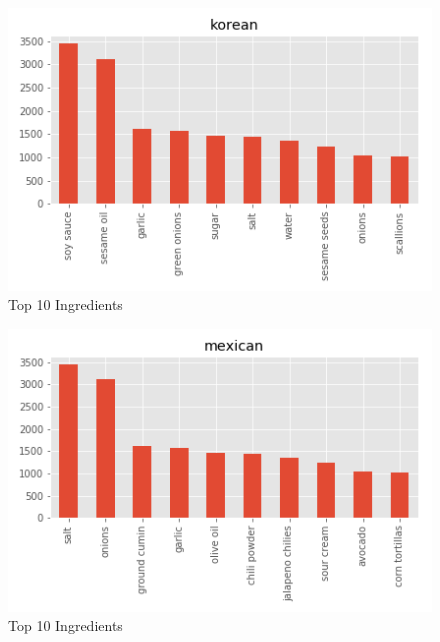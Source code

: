 \documentclass[sigconf]{acmart}
\begin{document}
\begin{figure}[!ht]
  \centering\includegraphics[width=\columnwidth]{images/korean_10_most_used_ingredients.png}
  \caption{Top 10 Ingredients }\label{f:korean_10_most_used_ingredients}
\end{figure}

\begin{figure}[!ht]
  \centering\includegraphics[width=\columnwidth]{images/mexican_10_most_used_ingredients.png}
  \caption{Top 10 Ingredients }\label{f:mexican_10_most_used_ingredients}
\end{figure}
\end{document}
